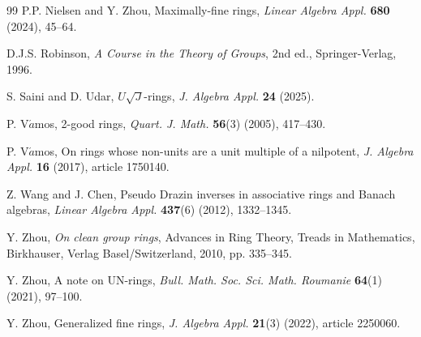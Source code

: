 \documentclass[11pt]{amsart}
\theoremstyle{definition}
\begin{document}
\begin{thebibliography}{99}
P.P. Nielsen and Y. Zhou, Maximally-fine rings, \textit{Linear Algebra Appl.} {\bf 680} (2024), 45--64.

D.J.S. Robinson, \textit{A Course in the Theory of Groups}, 2nd ed., Springer-Verlag, 1996.

S. Saini and D. Udar, $U\sqrt{J}$-rings, \textit{J. Algebra Appl.} {\bf 24} (2025).

P. V$\acute{a}$mos, 2-good rings, \textit{Quart. J. Math.} {\bf 56}(3) (2005), 417--430.

P. V$\acute{a}$mos, On rings whose non-units are a unit multiple of a nilpotent, \textit{J. Algebra Appl.} {\bf 16} (2017), article 1750140.

Z. Wang and J. Chen, Pseudo Drazin inverses in associative rings and Banach algebras, \textit{Linear Algebra Appl.} {\bf 437}(6) (2012), 1332--1345.

Y. Zhou, \textit{On clean group rings}, Advances in Ring Theory, Treads in Mathematics, Birkhauser, Verlag Basel/Switzerland, 2010, pp. 335--345.

Y. Zhou, A note on UN-rings, \textit{Bull. Math. Soc. Sci. Math. Roumanie} {\bf 64}(1) (2021), 97--100.

Y. Zhou, Generalized fine rings, \textit{J. Algebra Appl.} {\bf 21}(3) (2022), article 2250060.

\end{thebibliography}
\end{document}
